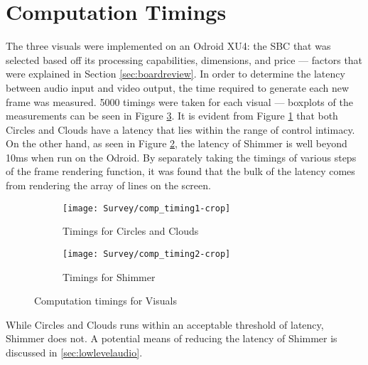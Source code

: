 \documentclass[../initial_thesis.tex]{subfiles}
\begin{document}
\section{Computation Timings} \label{sec:timings}
The three visuals were implemented on an Odroid XU4: the SBC that was selected based off its processing capabilities, dimensions, and price --- factors that were explained in Section \ref{sec:boardreview}. In order to determine the latency between audio input and video output, the time required to generate each new frame was measured. 5000 timings were taken for each visual --- boxplots of the measurements can be seen in Figure \ref{fig:comp_timings}. It is evident from Figure \ref{fig:timings_circlesclouds} that both Circles and Clouds have a latency that lies within the range of control intimacy. On the other hand, as seen in Figure \ref{fig:timings_shimmer}, the latency of Shimmer is well beyond 10ms when run on the Odroid. By separately taking the timings of various steps of the frame rendering function, it was found that the bulk of the latency comes from rendering the array of lines on the screen.

\begin{figure}
  \begin{subfigure}{0.5\textwidth}
    \centering
    \texttt{[image: Survey/comp\_timing1-crop]}
    \caption{Timings for Circles and Clouds}
    \label{fig:timings_circlesclouds}
  \end{subfigure}
  \begin{subfigure}{0.5\textwidth}
    \centering
    \texttt{[image: Survey/comp\_timing2-crop]}
    \caption{Timings for Shimmer}
    \label{fig:timings_shimmer}
  \end{subfigure}
  \caption{Computation timings for Visuals}
  \label{fig:comp_timings}
\end{figure}

While Circles and Clouds runs within an acceptable threshold of latency, Shimmer does not. A potential means of reducing the latency of Shimmer is discussed in \ref{sec:lowlevelaudio}. 
\end{document}
